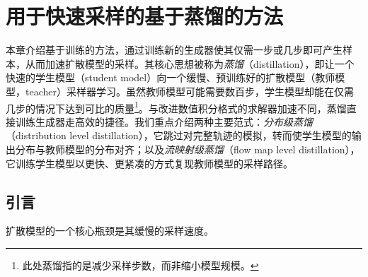 % 



% 
\chapter{用于快速采样的基于蒸馏的方法}\label{ch:distillation}

本章介绍基于训练的方法，通过训练新的生成器使其仅需一步或几步即可产生样本，从而加速扩散模型的采样。其核心思想被称为\emph{蒸馏}（distillation），即让一个快速的学生模型（student model）向一个缓慢、预训练好的扩散模型（教师模型，teacher）采样器学习。虽然教师模型可能需要数百步，学生模型却能在仅需几步的情况下达到可比的质量\footnote{此处蒸馏指的是减少采样步数，而非缩小模型规模。}。与改进数值积分格式的求解器加速不同，蒸馏直接训练生成器走高效的捷径。我们重点介绍两种主要范式：\emph{分布级蒸馏}（distribution level distillation），它跳过对完整轨迹的模拟，转而使学生模型的输出分布与教师模型的分布对齐；以及\emph{流映射级蒸馏}（flow map level distillation），它训练学生模型以更快、更紧凑的方式复现教师模型的采样路径。





\clearpage
\newpage


\section{引言}\label{sec:distillation-prologue}
扩散模型的一个核心瓶颈是其缓慢的采样速度。

